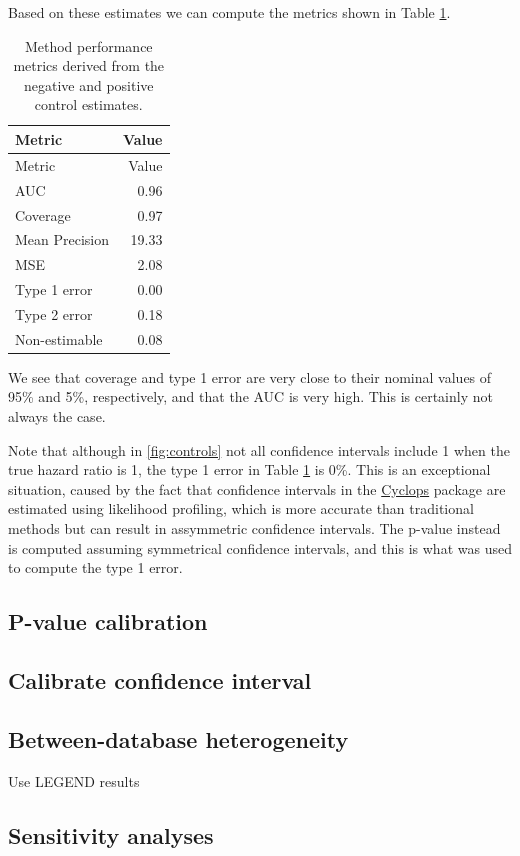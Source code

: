 \documentclass[11pt]{book}
\begin{document}
Based on these estimates we can compute the metrics shown in Table
\ref{tab:exampleMetrics}.

\begin{longtable}[]{@{}lr@{}}
\caption{\label{tab:exampleMetrics} Method performance metrics derived from
the negative and positive control estimates.}\tabularnewline
\toprule
Metric & Value\tabularnewline
\midrule
\endfirsthead
\toprule
Metric & Value\tabularnewline
\midrule
\endhead
AUC & 0.96\tabularnewline
Coverage & 0.97\tabularnewline
Mean Precision & 19.33\tabularnewline
MSE & 2.08\tabularnewline
Type 1 error & 0.00\tabularnewline
Type 2 error & 0.18\tabularnewline
Non-estimable & 0.08\tabularnewline
\bottomrule
\end{longtable}

We see that coverage and type 1 error are very close to their nominal
values of 95\% and 5\%, respectively, and that the AUC is very high.
This is certainly not always the case.

Note that although in \ref{fig:controls} not all confidence intervals
include 1 when the true hazard ratio is 1, the type 1 error in Table
\ref{tab:exampleMetrics} is 0\%. This is an exceptional situation,
caused by the fact that confidence intervals in the
\href{https://ohdsi.github.io/Cyclops/}{Cyclops} package are estimated
using likelihood profiling, which is more accurate than traditional
methods but can result in assymmetric confidence intervals. The p-value
instead is computed assuming symmetrical confidence intervals, and this
is what was used to compute the type 1 error.

\subsection{P-value calibration}\label{p-value-calibration-1}

\subsection{Calibrate confidence
interval}\label{calibrate-confidence-interval}

\subsection{Between-database
heterogeneity}\label{between-database-heterogeneity}

Use LEGEND results

\subsection{Sensitivity analyses}\label{sensitivity-analyses-1}
\end{document}
